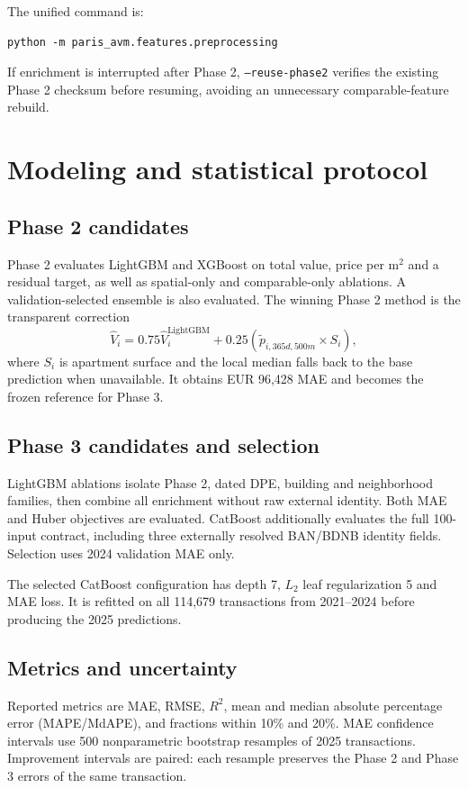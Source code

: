 \documentclass[11pt,a4paper]{article}
\begin{document}
The unified command is:
\begin{verbatim}
python -m paris_avm.features.preprocessing
\end{verbatim}
If enrichment is interrupted after Phase 2, \texttt{--reuse-phase2} verifies
the existing Phase 2 checksum before resuming, avoiding an unnecessary
comparable-feature rebuild.

\section{Modeling and statistical protocol}

\subsection{Phase 2 candidates}

Phase 2 evaluates LightGBM and XGBoost on total value, price per m$^2$ and a
residual target, as well as spatial-only and comparable-only ablations. A
validation-selected ensemble is also evaluated. The winning Phase 2 method is
the transparent correction
\[
  \widehat V_i = 0.75\widehat V_i^{\mathrm{LightGBM}}
  + 0.25\left(\widetilde p_{i,365d,500m}\times S_i\right),
\]
where $S_i$ is apartment surface and the local median falls back to the base
prediction when unavailable. It obtains EUR 96,428 MAE and becomes the frozen
reference for Phase 3.

\subsection{Phase 3 candidates and selection}

LightGBM ablations isolate Phase 2, dated DPE, building and neighborhood
families, then combine all enrichment without raw external identity. Both MAE
and Huber objectives are evaluated. CatBoost additionally evaluates the full
100-input contract, including three externally resolved BAN/BDNB identity
fields. Selection uses 2024 validation MAE only.

The selected CatBoost configuration has depth 7, $L_2$ leaf regularization 5
and MAE loss. It is refitted on all 114,679 transactions from 2021--2024 before
producing the 2025 predictions.

\subsection{Metrics and uncertainty}

Reported metrics are MAE, RMSE, $R^2$, mean and median absolute percentage error
(MAPE/MdAPE), and fractions within 10\% and 20\%. MAE confidence intervals use
500 nonparametric bootstrap resamples of 2025 transactions. Improvement
intervals are paired: each resample preserves the Phase 2 and Phase 3 errors of
the same transaction.
\end{document}
